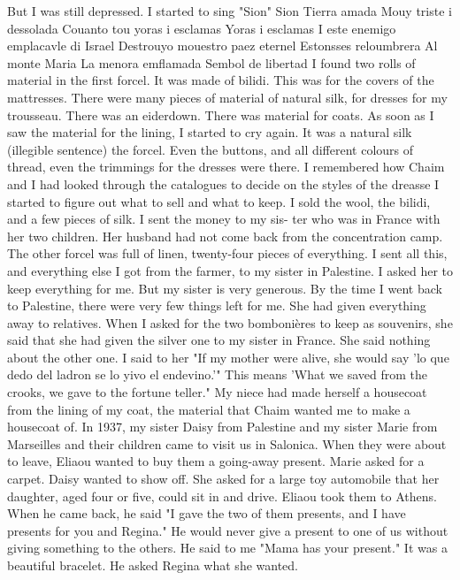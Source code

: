 But I was still depressed.
I started to sing "Sion" 
Sion Tierra amada 
Mouy triste i dessolada 
Couanto tou yoras i esclamas 
Yoras i esclamas 
I este enemigo emplacavle di Israel 
Destrouyo mouestro paez eternel 
Estonsses reloumbrera 
Al monte Maria 
La menora emflamada 
Sembol de libertad 
I found two rolls of material in the first forcel.
It was made of 
bilidi.
This was for the covers of the mattresses.
There were many 
pieces of material of natural silk, for dresses for my trousseau.
There 
was an eiderdown.
There was material for coats.
As soon as I saw the 
material for the lining, I started to cry again.
It was a natural silk 
(illegible sentence)
the forcel.
Even the buttons, and all different colours of thread, even 
the trimmings for the dresses were there.
I remembered how Chaim and I 
had looked through the catalogues to decide on the styles of the dreasse 
I started to figure out what to sell and what to keep.
I sold the 
wool, the bilidi, and a few pieces of silk.
I sent the money to my sis-
ter who was in France with her two children.
Her husband had not come 
back from the concentration camp.
The other forcel was full of linen, twenty-four pieces of everything.
I sent all this, and everything else I got from the farmer, to my sister 
in Palestine.
I asked her to keep everything for me.
But my sister is 
very generous.
By the time I went back to Palestine, there were very few 
things left for me.
She had given everything away to relatives.
When 
I asked for the two bombonières to keep as souvenirs, she said that she 
had given the silver one to my sister in France.
She said nothing about 
the other one.
I said to her "If my mother were alive, she would say 
'lo que dedo del ladron se lo yivo el endevino.'"
This means 'What we 
saved from the crooks, we gave to the fortune teller."
My niece had made herself a housecoat from the lining of my coat, 
the material that Chaim wanted me to make a housecoat of.
In 1937, my sister Daisy from Palestine and my sister Marie from 
Marseilles and their children came to visit us in Salonica.
When they 
were about to leave, Eliaou wanted to buy them a going-away present.
Marie asked for a carpet.
Daisy wanted to show off.
She asked for a 
large toy automobile that her daughter, aged four or five, could sit in 
and drive.
Eliaou took them to Athens.
When he came back, he said "I 
gave the two of them presents, and I have presents for you and Regina."
He would never give a present to one of us without giving something to 
the others.
He said to me "Mama has your present."
It was a beautiful 
bracelet.
He asked Regina what she wanted.
